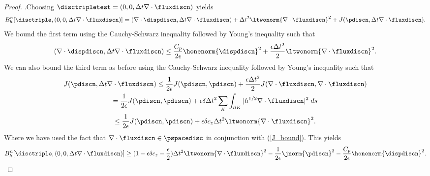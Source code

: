 \begin{proof}
.\newline  Choosing $\disctripletest=(0,0,\Delta t \nabla \cdot \fluxdiscn)$ yields
\begin{equation*}
  B_{h}^{n}[\disctriple,(0,0,\Delta t\nabla \cdot \fluxdiscn)]= (\nabla \cdot\dispdiscn,\Delta t\nabla \cdot \fluxdiscn) + \Delta t^{2}\ltwonorm{\nabla \cdot \fluxdiscn}^{2} + J(\pdiscn,\Delta t\nabla \cdot \fluxdiscn).
\end{equation*}
We bound the first term using the Cauchy-Schwarz inequality followed by Young's inequality such that
\begin{equation*}
(\nabla \cdot\dispdiscn,\Delta t\nabla \cdot \fluxdiscn) \leq \frac{C_{p}}{2\epsilon}\honenorm{\dispdiscn}^{2}+ \frac{\epsilon\Delta t^{2}}{2}\ltwonorm{\nabla \cdot \fluxdiscn}^{2}.
\end{equation*}
We can also bound the third term as before using the Cauchy-Schwarz inequality followed by Young's inequality such that
\begin{multline}
J(\pdiscn,\Delta t\nabla \cdot \fluxdiscn) \leq \frac{1}{2\epsilon}J(\pdiscn,\pdiscn) + \frac{\epsilon\Delta t^{2}}{2}J(\nabla \cdot \fluxdiscn,\nabla \cdot \fluxdiscn) \\
= \frac{1}{2\epsilon}J(\pdiscn,\pdiscn) + {\epsilon \delta \Delta t^{2}}\sum_{K} \int_{\partial K }  |h^{1/2}\nabla \cdot \fluxdiscn|^{2} \;ds \\ \leq \frac{1}{2 \epsilon}J(\pdiscn,\pdiscn) + {\epsilon \delta c_{z}  \Delta t^{2}}\ltwonorm{\nabla \cdot \fluxdiscn}^{2}.
\label{eqn:J_pdivzbound}
\end{multline}
Where we have used the fact that ${\nabla\cdot\fluxdiscn} \in \pspacedisc $ in conjunction with (\ref{J_bound}). This yields
\begin{equation}
  B_{h}^{n}[\disctriple,(0,0, \Delta t \nabla \cdot \fluxdiscn)] \geq (1-{\epsilon\delta c_{z}}-\frac{\epsilon}{2})\Delta t^{2}\ltwonorm{\nabla \cdot \fluxdiscn}^{2} -\frac{1}{2 \epsilon }\jnorm{\pdiscn}^{2}-\frac{C_{p}}{2 \epsilon }\honenorm{\dispdiscn}^{2}.
  \label{divfluxbound}
\end{equation} \newline



\end{proof}
